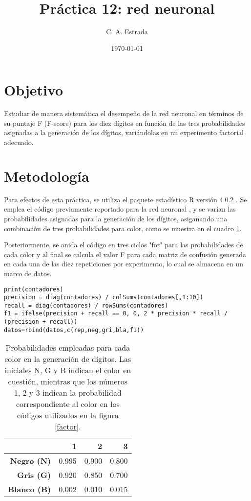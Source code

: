 \documentclass{article}
\title{\bf Práctica 12: red neuronal}
\date{\today}
\author{C. A. Estrada}
\begin{document}
\maketitle

\section{Objetivo}
Estudiar de manera sistemática el desempeño de la red neuronal en términos de su puntaje F (F-score) \cite{dra} para los diez dígitos en función de las tres probabilidades asignadas a la generación de los dígitos, variándolas en un experimento factorial adecuado.

\section{Metodología}
Para efectos de esta práctica, se utiliza el paquete estadístico R versión 4.0.2 \cite{R}. Se emplea el código previamente reportado para la red neuronal \cite{dra}, y se varían las probabilidades asignadas para la generación de los dígitos, asiganando una combinación de tres probabilidades para color, como se muestra en el cuadro \ref{prob}. 

Posteriormente, se anida el código en tres ciclos "for" para las probabilidades de cada color y al final se calcula el valor F para cada matriz de confusión generada en cada una de las diez repeticiones por experimento, lo cual se almacena en un marco de datos.
\begin{lstlisting}
print(contadores)
precision = diag(contadores) / colSums(contadores[,1:10])
recall = diag(contadores) / rowSums(contadores)
f1 = ifelse(precision + recall == 0, 0, 2 * precision * recall / (precision + recall))
datos=rbind(datos,c(rep,neg,gri,bla,f1))
\end{lstlisting}

\begin{table}[h]
\begin{center}
\caption{Probabilidades empleadas para cada color en la generación de dígitos. Las iniciales N, G y B indican el color en cuestión, mientras que los números 1, 2 y 3 indican la probabilidad correspondiente al color en los códigos utilizados en la figura \ref{factor}.}
\label{prob}
\begin{tabular}{|r| r| r| r|}
\hline
 &\textbf{1}&\textbf{2}&\textbf{3}\\
\hline
\textbf{Negro (N)}&0.995&0.900&0.800\\
\textbf{Gris (G)}&0.920&0.850&0.700\\
\textbf{Blanco (B)}&0.002&0.010&0.015\\
\hline
\end{tabular}
\end{center}
\end{table}
\end{document}
